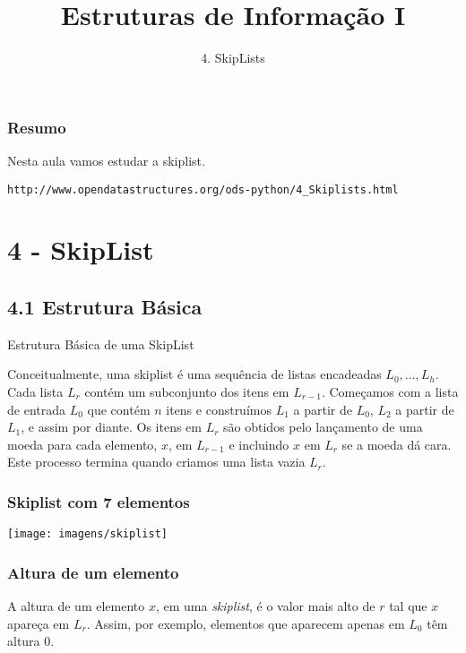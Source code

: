\documentclass{beamer}
\title[\sc{Estruturas de Informação I}]{Estruturas de Informação I}
\subtitle{4. SkipLists}
\begin{document}
\begin{frame}
  \titlepage
\end{frame}

\begin{frame}
	\frametitle{Resumo}
	Nesta aula vamos estudar a skiplist.
	
	{\footnotesize \texttt{http://www.opendatastructures.org/ods-python/4\_Skiplists.html}}
	\tableofcontents
\end{frame}

\section{4 -  SkipList}

\subsection{4.1 Estrutura Básica}
\begin{frame}
	\LARGE{\alert{Estrutura Básica de uma SkipList}}
	
	\normalsize
	Conceitualmente, uma skiplist é uma sequência de listas encadeadas $ L_0,\ldots,L_h$. Cada lista $ L_r$ contém um subconjunto dos itens em $ L_{r-1}$. Começamos com a lista de entrada $ L_0$ que contém $ \ensuremath{\ensuremath{\mathit{n}}}$ itens e construímos $ L_1$ a partir de $ L_0$, $ L_2$ a partir de $ L_1$, e assim por diante. Os itens em $ L_r$ são obtidos pelo lançamento de uma moeda para cada elemento, $ \ensuremath{\ensuremath{\mathit{x}}}$, em $ L_{r-1}$ e incluindo $ \ensuremath{\ensuremath{\mathit{x}}}$ em $ L_r$ se a moeda dá cara. Este processo termina quando criamos uma lista vazia $ L_r$.
\end{frame}

\begin{frame}
\frametitle{Skiplist com 7 elementos}
\texttt{[image: imagens/skiplist]}
\end{frame}

\begin{frame}
\frametitle{Altura de um elemento}
 A altura de um elemento $ \ensuremath{\ensuremath{\mathit{x}}}$, em uma \textit{skiplist}, é o valor mais alto de $ r$ tal que $ \ensuremath{\ensuremath{\mathit{x}}}$ apareça em $ L_r$. Assim, por exemplo, elementos que aparecem apenas em $ L_0$ têm altura 0.
\end{frame}
\end{document}
